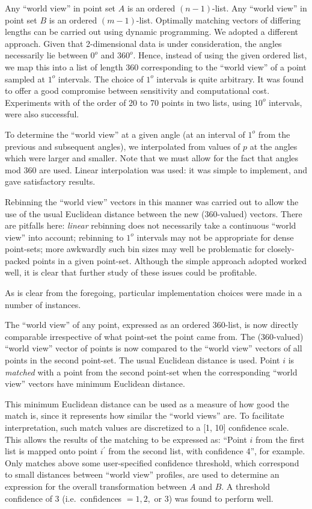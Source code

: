 Any ``world view'' in point set $A$ is an ordered $(n-1)$-list.  Any ``world
view'' in point set $B$ is an ordered $(m-1)$-list. Optimally matching
vectors of differing lengths can be carried out using dynamic programming.
We adopted a
different approach.  Given that 2-dimensional data is under consideration,
the angles necessarily lie between $0^o$ and $360^o$.  Hence, instead of 
using the given ordered list, we map this into a list of length 360
corresponding to the ``world view'' of a point sampled at $1^o$ intervals.
The choice of $1^o$ intervals is quite arbitrary.  It was found 
to offer a good compromise between 
sensitivity and computational cost.  Experiments with of the order of 20 to 70
points in two lists, using $10^o$ intervals, were also successful.

To determine the ``world view'' at 
a given angle (at an interval of $1^o$ from the previous and subsequent
angles), we interpolated from values of $p$ at the angles which were larger
and smaller.  Note that we must allow for the fact that angles mod $360$ are
used.  Linear interpolation was used: it was simple to 
implement, and gave satisfactory results.   
 
Rebinning the ``world view'' vectors in this manner was carried out to 
allow the use of the usual Euclidean distance between the new (360-valued)
vectors.  There are pitfalls here: {\it linear} rebinning does not necessarily
take a continuous ``world view'' into account; rebinning to $1^o$ intervals
may not be appropriate for dense point-sets; more awkwardly such bin sizes
may well be problematic for closely-packed points in a given point-set.
Although the simple approach adopted worked well, it is clear that further
study of these issues could be profitable.

As is clear from the foregoing, particular implementation choices were made
in a number of instances. 

The ``world view'' of any point, expressed as an ordered 360-list, is now
directly comparable irrespective of what point-set the point came from.
The (360-valued) ``world view'' vector of points is now compared to the 
``world view'' vectors of all points in the second point-set.  The 
usual Euclidean distance is used.  Point $i$ is {\it matched} with a
point from the second point-set when the corresponding ``world view'' 
vectors have minimum Euclidean distance.  

This minimum Euclidean distance
can be used as a measure of how good the match is, since it represents
how similar the ``world views'' are.  To facilitate interpretation, such
match values are discretized to a [1, 10] confidence scale.  This 
allows the results of the matching
to be expressed as: ``Point $i$ from the first list is
mapped onto point $i^{\prime}$ from the second list, with confidence 4'', for
example.  Only matches above some user-specified  confidence threshold, 
which correspond to small distances between
``world view'' profiles, are used to determine an expression for the 
overall transformation between $A$ and $B$.  A threshold confidence of 3 (i.e.\
confidences $= 1, 2,$ or $3$) was found to perform well.

